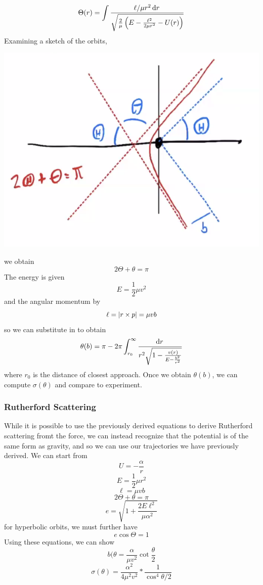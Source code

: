 \[\Theta(r) = \int\frac{\ell/\mu r^2 \d{r}}{\sqrt{\frac{2}{\mu}\left(E-\frac{\ell^2}{2\mu r^2}-U(r)\right)}}\]
Examining a sketch of the orbits, 
\begin{center}
	\includegraphics[scale = 0.3]{scattering.png}
\end{center}
we obtain 
\[2\Theta + \theta = \pi\]
The energy is given
\[E = \frac{1}{2}\mu v^2\]
and the angular momentum by
\[\ell = \left|r\times p\right| = \mu v b\]
so we can substitute in to obtain
\[\theta(b) = \pi - 2\pi \int_{r_0}^\infty \frac{\d{r}}{r^2\sqrt{1-\frac{v(r)}{E - \frac{b^2}{r^2}}}}\]
where \(r_0\) is the distance of closest approach. Once we obtain \(\theta(b)\), we can compute \(\sigma(\theta)\) and compare to experiment.
\subsubsection{Rutherford Scattering}
While it is possible to use the previously derived equations to derive Rutherford scattering fromt the force, we can instead recognize that the potential is of the same form as gravity, and so we can use our trajectories we have previously derived. We can start from
\[U = -\frac{\alpha}{r}\]
\[E = \frac{1}{2}\mu r^2\]
\[\ell = \mu vb\]
\[2\Theta + \theta = \pi\]
\[e = \sqrt{1+\frac{2E\ell^2}{\mu \alpha^2}}\]
for hyperbolic orbits, we must further have
\[e \cos\Theta = 1\]
Using these equations, we can show
\[b(\theta = \frac{\alpha}{\mu v^2}\cot\frac{\theta}{2}\]
\[\sigma(\theta) = \frac{\alpha^2}{4\mu^2 v^2}*\frac{1}{\cos^4\theta/2}\]
